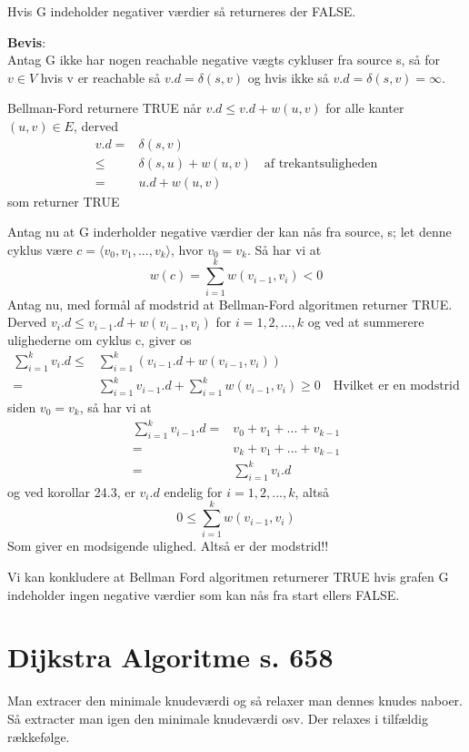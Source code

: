 \documentclass[11pt,a4paper]{report}
\theoremstyle{plain}
\theoremstyle{definition}
\theoremstyle{remark}
\numberwithin{equation}{section}
\begin{document}
Hvis G indeholder negativer værdier så returneres der FALSE.

\textbf{Bevis}:\\
Antag G ikke har nogen reachable negative vægts cykluser fra source s, så for $v\in V$ hvis v er reachable så $v.d = \delta(s,v)$ og hvis ikke så $v.d = \delta(s,v) = \infty$.

Bellman-Ford returnere TRUE når $v.d\leq v.d + w(u,v)$ for alle kanter $(u,v)\in E$, derved
\begin{align*}
  v.d =& \delta(s,v) \\
  \leq & \delta(s,u) + w(u,v) \quad \text{af trekantsuligheden} \\
  =& u.d + w(u,v)
\end{align*}
som returner TRUE

Antag nu at G inderholder negative værdier der kan nås fra source, s; let denne cyklus være $c=\langle v_0, v_1, ... ,v_k\rangle$, hvor $v_0=v_k$. Så har vi at
\[
w(c) = \sum_{i=1}^{k} w(v_{i-1},v_i) < 0
\]
Antag nu, med formål af modstrid at Bellman-Ford algoritmen returner TRUE. Derved $v_i .d \leq v_{i-1} .d + w(v_{i-1}, v_i)$ for $i=1,2,...,k$ og ved at summerere ulighederne om cyklus c, giver os
\begin{align*}
  \sum_{i=1}^{k} v_i .d \leq& \sum_{i=1}^{k} (v_{i-1}.d + w(v_{i-1},v_i)) \\
  = & \sum_{i=1}^{k} v_{i-1}.d + \sum_{i=1}^{k} w(v_{i-1},v_i) \geq 0 \quad \text{Hvilket er en modstrid}
\end{align*}
siden $v_0=v_k$, så har vi at
\begin{align*}
  \sum_{i=1}^{k} v_{i-1} .d =  & v_0 + v_1 + ... + v_{k-1} \\
  = & v_k + v_1 + ... + v_{k-1}\\
  = & \sum_{i=1}^{k} v_{i} .d
\end{align*}
og ved korollar 24.3, er $v_i.d$ endelig for $i=1,2,...,k$, altså
\[
0\leq \sum_{i=1}^{k} w(v_{i-1},v_i)
\]
Som giver en modsigende ulighed. Altså er der modstrid!!

Vi kan konkludere at Bellman Ford algoritmen returnerer TRUE hvis grafen G indeholder ingen negative værdier som kan nås fra start ellers FALSE.


\section{Dijkstra Algoritme s. 658}
Man extracer den minimale knudeværdi og så relaxer man dennes knudes naboer. Så extracter man igen den minimale knudeværdi osv. Der relaxes i tilfældig rækkefølge.
\end{document}
